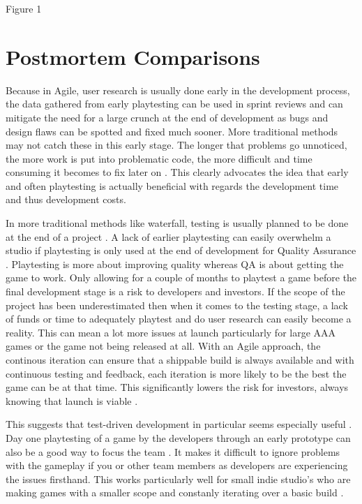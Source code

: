 \documentclass{scrartcl}
\begin{document}
\begin{center}
Figure 1 \cite{GDCAttn:3}
\end{center}

\section{Postmortem Comparisons}

Because in Agile, user research is usually done early in the development process, the data gathered from early playtesting can be used in sprint reviews and can mitigate the need for a large crunch at the end of development as bugs and design flaws can be spotted and fixed much sooner\cite{PMKOA:4}. More traditional methods may not catch these in this early stage. The longer that problems go unnoticed, the more work is put into problematic code, the more difficult and time consuming it becomes to fix later on \cite{GDCOTC:5}. This clearly advocates the idea that early and often playtesting is actually beneficial with regards the development time and thus development costs. \par
In more traditional methods like waterfall, testing is usually planned to be done at the end of a project \cite{ji2011comparing:6}. A lack of earlier playtesting can easily overwhelm a studio if playtesting is only used at the end of development for Quality Assurance \cite{PMTrine:7}. Playtesting is more about improving quality whereas QA is about getting the game to work. Only allowing for a couple of months to playtest a game before the final development stage is a risk to developers and investors. If the scope of the project has been underestimated then when it comes to the testing stage, a lack of funds or time to adequately playtest and do user research can easily become a reality\cite{PMZZ:8}. This can mean a lot more issues at launch particularly for large AAA games \cite{BrokenGames:9} or the game not being released at all. With an Agile approach, the continous iteration can ensure that a shippable build is always available and with continuous testing and feedback, each iteration is more likely to be the best the game can be at that time. This significantly lowers the risk for investors, always knowing that launch is viable \cite{ghane2017quantitative:10}. \par
This suggests that test-driven development in particular seems especially useful \cite{cunningham2005costs:11}.
Day one playtesting of a game by the developers through an early prototype can also be a good way to focus the team \cite{Yampolsky:2016:LGD:2896958.2896965:12}. It makes it difficult to ignore problems with the gameplay if you or other team members as developers are experiencing the issues firsthand. This works particularly well for small indie studio's who are making games with a smaller scope and constanly iterating over a basic build \cite{PMNS2:13}.
\end{document}
